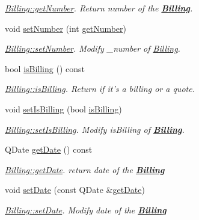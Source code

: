 \begin{DoxyCompactItemize}
\begin{DoxyCompactList}\small\item\em \hyperlink{classBilling_a23a9446aef6af58bcfa698b76cc24731}{Billing\+::get\+Number}. Return number of the {\bfseries \hyperlink{classBilling}{Billing}}. \end{DoxyCompactList}\item 
void \hyperlink{classBilling_a1178eab66407b0761c35a13d8da84cdb}{set\+Number} (int \hyperlink{classBilling_a23a9446aef6af58bcfa698b76cc24731}{get\+Number})
\begin{DoxyCompactList}\small\item\em \hyperlink{classBilling_a1178eab66407b0761c35a13d8da84cdb}{Billing\+::set\+Number}. Modify {\itshape \+\_\+number} of \hyperlink{classBilling}{Billing}. \end{DoxyCompactList}\item 
bool \hyperlink{classBilling_ad616bbb5664e0ba2bac6982f06a7c723}{is\+Billing} () const 
\begin{DoxyCompactList}\small\item\em \hyperlink{classBilling_ad616bbb5664e0ba2bac6982f06a7c723}{Billing\+::is\+Billing}. Return if it's a billing or a quote. \end{DoxyCompactList}\item 
void \hyperlink{classBilling_a81a3b85e0e051239521b4e3d93f297c2}{set\+Is\+Billing} (bool \hyperlink{classBilling_ad616bbb5664e0ba2bac6982f06a7c723}{is\+Billing})
\begin{DoxyCompactList}\small\item\em \hyperlink{classBilling_a81a3b85e0e051239521b4e3d93f297c2}{Billing\+::set\+Is\+Billing}. Modify {\itshape is\+Billing} of {\bfseries \hyperlink{classBilling}{Billing}}. \end{DoxyCompactList}\item 
Q\+Date \hyperlink{classBilling_ad3657e1cdf05613cfca4b22b62976213}{get\+Date} () const 
\begin{DoxyCompactList}\small\item\em \hyperlink{classBilling_ad3657e1cdf05613cfca4b22b62976213}{Billing\+::get\+Date}. return date of the {\bfseries \hyperlink{classBilling}{Billing}} \end{DoxyCompactList}\item 
void \hyperlink{classBilling_ad1cb89772dc12335543ff7d422d18bd4}{set\+Date} (const Q\+Date \&\hyperlink{classBilling_ad3657e1cdf05613cfca4b22b62976213}{get\+Date})
\begin{DoxyCompactList}\small\item\em \hyperlink{classBilling_ad1cb89772dc12335543ff7d422d18bd4}{Billing\+::set\+Date}. Modify {\itshape date} of the {\bfseries \hyperlink{classBilling}{Billing}} \end{DoxyCompactList}\end{DoxyCompactItemize}
